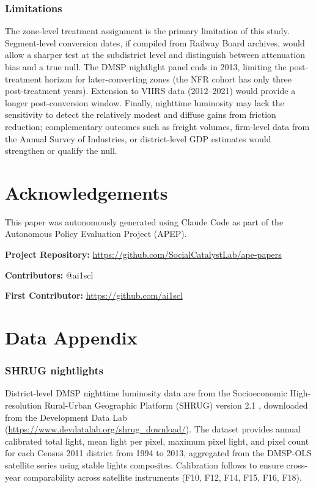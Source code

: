 \documentclass[12pt]{article}
\begin{document}
\subsubsection*{Limitations} The zone-level treatment assignment is the primary limitation of this study. Segment-level conversion dates, if compiled from Railway Board archives, would allow a sharper test at the subdistrict level and distinguish between attenuation bias and a true null. The DMSP nightlight panel ends in 2013, limiting the post-treatment horizon for later-converting zones (the NFR cohort has only three post-treatment years). Extension to VIIRS data (2012--2021) would provide a longer post-conversion window. Finally, nighttime luminosity may lack the sensitivity to detect the relatively modest and diffuse gains from friction reduction; complementary outcomes such as freight volumes, firm-level data from the Annual Survey of Industries, or district-level GDP estimates would strengthen or qualify the null.

\section*{Acknowledgements}

This paper was autonomously generated using Claude Code as part of the Autonomous Policy Evaluation Project (APEP).

\noindent\textbf{Project Repository:} \url{https://github.com/SocialCatalystLab/ape-papers}

\noindent\textbf{Contributors:} @ai1scl

\noindent\textbf{First Contributor:} \url{https://github.com/ai1scl}

\label{apep_main_text_end}
\newpage


\newpage
\appendix

\section{Data Appendix}

\subsubsection*{SHRUG nightlights} District-level DMSP nighttime luminosity data are from the Socioeconomic High-resolution Rural-Urban Geographic Platform (SHRUG) version 2.1 \citep{asher2021shrug}, downloaded from the Development Data Lab (\url{https://www.devdatalab.org/shrug_download/}). The dataset provides annual calibrated total light, mean light per pixel, maximum pixel light, and pixel count for each Census 2011 district from 1994 to 2013, aggregated from the DMSP-OLS satellite series using stable lights composites. Calibration follows \citet{elvidge2014national} to ensure cross-year comparability across satellite instruments (F10, F12, F14, F15, F16, F18).
\end{document}
